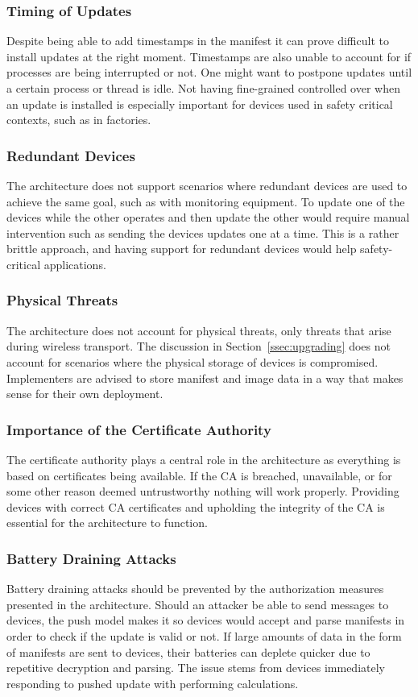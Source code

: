 \documentclass[0-thesis.tex]{subfiles}
\begin{document}
\subsubsection{Timing of Updates}
Despite being able to add timestamps in the manifest it can prove difficult to install
updates at the right moment. Timestamps are also unable to account for if processes are
being interrupted or not. One might want to postpone updates until a certain process or
thread is idle. Not having fine-grained controlled over when an update is installed is
especially important for devices used in safety critical contexts, such as in factories.

\subsubsection{Redundant Devices}
The architecture does not support scenarios where redundant devices are used to achieve
the same goal, such as with monitoring equipment. To update one of the devices while the other
operates and then update the other would require manual intervention such as sending the
devices updates one at a time. This is a rather brittle approach, and having support for
redundant devices would help safety-critical applications.

\subsubsection{Physical Threats}
The architecture does not account for physical threats, only threats that arise during
wireless transport. The discussion in Section~\ref{ssec:upgrading} does not account for
scenarios where the physical storage of devices is compromised. Implementers are advised
to store manifest and image data in a way that makes sense for their own deployment.

\subsubsection{Importance of the Certificate Authority}
The certificate authority plays a central role in the architecture as everything is based
on certificates being available. If the CA is breached, unavailable, or for some other
reason deemed untrustworthy nothing will work properly. Providing devices with correct CA
certificates and upholding the integrity of the CA is essential for the architecture to
function.

\subsubsection{Battery Draining Attacks}
Battery draining attacks should be prevented by the authorization measures presented in
the architecture. Should an attacker be able to send messages to devices, the push model
makes it so devices would accept and parse manifests in order to check if the update is
valid or not. If large amounts of data in the form of manifests are sent to devices, their
batteries can deplete quicker due to repetitive decryption and parsing. The issue stems
from devices immediately responding to pushed update with performing calculations.
\end{document}
